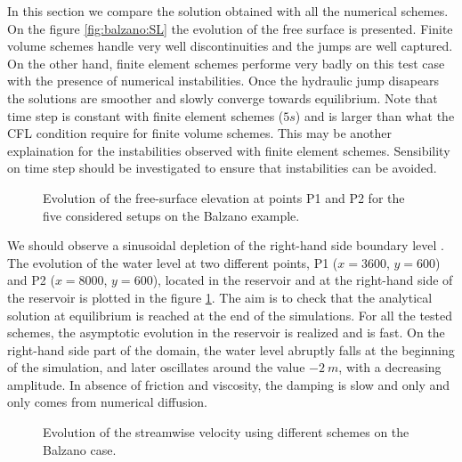 In this section we compare the solution obtained with all the numerical schemes.
On the figure \ref{fig:balzano:SL} the evolution of the free surface is presented.
Finite volume schemes handle very well discontinuities and the jumps are well captured.
On the other hand, finite element schemes performe very badly on this test case with
the presence of numerical instabilities. Once the hydraulic jump disapears the solutions are smoother
and slowly converge towards equilibrium. Note that time step is constant with finite element schemes
($5s$)
and is larger than what the CFL condition require for finite volume schemes. 
This may be another explaination for the instabilities observed with finite element schemes. Sensibility on
time step should be investigated to ensure that instabilities can be avoided.

\begin{figure}[H]
\begin{minipage}[t]{0.5\textwidth}
 \centering
\end{minipage}%
\begin{minipage}[t]{0.5\textwidth}
 \centering
\end{minipage}
\caption{Evolution of the free-surface elevation at points P1 and P2 for the five considered setups on the Balzano example.}
\label{fig:balzano:temporalSL}
\end{figure}

We should observe a sinusoidal depletion of the right-hand side boundary level \cite{Balzano1997}.
The evolution of the water level at two different points, P1 ($x=3600$, $y=600$) and P2 ($x=8000$, $y=600$), located in the reservoir and at the right-hand side of the reservoir is plotted in the figure \ref{fig:balzano:temporalSL}.
The aim is to check that the analytical solution at equilibrium is reached at the end of the simulations.
For all the tested schemes, the asymptotic evolution in the reservoir is realized and is fast.
On the right-hand side part of the domain, the water level abruptly falls at the beginning of
the simulation, and later oscillates around the value $-2~m$,
with a decreasing amplitude. In absence of friction and viscosity, the damping is slow and only 
and only comes from numerical diffusion.

\begin{figure}[H]
\begin{minipage}[t]{0.5\textwidth}
 \centering
\end{minipage}%
\begin{minipage}[t]{0.5\textwidth}
 \centering
\end{minipage}
\caption{Evolution of the streamwise velocity using different schemes on the Balzano case.}
\label{fig:balzano:temporalU}
\end{figure}

